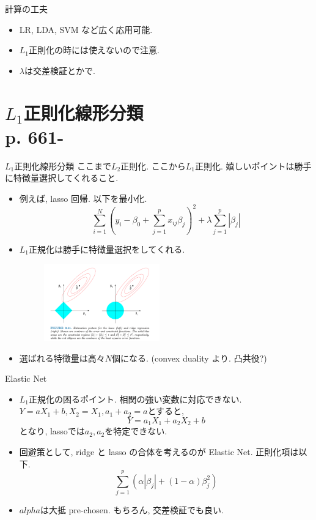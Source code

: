 \documentclass[dvipdfmx,8pt]{beamer}
\begin{document}
  \begin{frame}{計算の工夫}
    \begin{itemize}
      \item LR, LDA, SVM など広く応用可能.
      \item $L_1$正則化の時には使えないので注意.
      \item $\lambda$は交差検証とかで.
    \end{itemize}
  \end{frame}
  \section{$L_1$正則化線形分類\\p. 661-}
\begin{frame}{$L_1$正則化線形分類}
    ここまで$L_2$正則化. ここから$L_1$正則化. 嬉しいポイントは勝手に特徴量選択してくれること.
    \begin{itemize}
      \item 例えば, lasso 回帰. 以下を最小化.
        \[
          \sum_{i=1}^N\left(y_i-\beta_0+\sum_{j=1}^px_{ij}\beta_j\right) ^2+\lambda\sum_{j=1}^p|\beta_j|
        \]
      \item $L_1$正規化は勝手に特徴量選択をしてくれる.
        \begin{figure}[htb]
          \centering
          \includegraphics[width=5cm]{./images/automatic-feature-selection.jpg}
        \end{figure}
      \item 選ばれる特徴量は高々$N$個になる. (convex duality より. 凸共役?)
    \end{itemize}
  \end{frame}
  \begin{frame}{Elastic Net}
    \begin{itemize}
      \item $L_1$正規化の困るポイント. 相関の強い変数に対応できない. \\
        $Y=aX_1+b, X_2=X_1,a_1+a_2=a$とすると,
        \[
          Y=a_1X_1+a_2X_2+b
        \]
        となり, lassoでは$a_2,a_2$を特定できない.
      \item 回避策として, ridge と lasso の合体を考えるのが Elastic Net. 正則化項は以下.
        \[
          \sum_{j=1}^p(\alpha|\beta_j|+(1-\alpha)\beta_j^2)
        \]
      \item $alpha$は大抵 pre-chosen. もちろん, 交差検証でも良い.
    \end{itemize}
  \end{frame}
\end{document}

